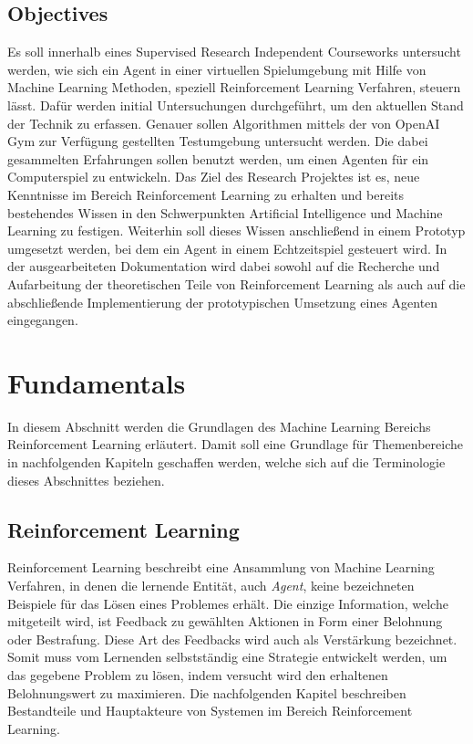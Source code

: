 \documentclass[11pt]{scrartcl}
\begin{document}
\subsection{Objectives}
Es soll innerhalb eines Supervised Research Independent Courseworks untersucht werden, wie
sich ein Agent in einer virtuellen Spielumgebung mit Hilfe von Machine Learning Methoden,
speziell Reinforcement Learning Verfahren, steuern lässt. Dafür werden initial
Untersuchungen durchgeführt, um den aktuellen Stand der Technik zu erfassen. Genauer
sollen Algorithmen mittels der von OpenAI Gym zur Verfügung gestellten Testumgebung
untersucht werden. Die dabei gesammelten Erfahrungen sollen benutzt werden, um einen
Agenten für ein Computerspiel zu entwickeln. Das Ziel des Research Projektes ist es, neue
Kenntnisse im Bereich Reinforcement Learning zu erhalten und bereits bestehendes Wissen in
den Schwerpunkten Artificial Intelligence und Machine Learning zu festigen. Weiterhin soll
dieses Wissen anschließend in einem Prototyp umgesetzt werden, bei dem ein Agent in einem
Echtzeitspiel gesteuert wird. In der ausgearbeiteten Dokumentation wird dabei sowohl auf die
Recherche und Aufarbeitung der theoretischen Teile von Reinforcement Learning als auch auf
die abschließende Implementierung der prototypischen Umsetzung eines Agenten eingegangen.


\newpage
\section{Fundamentals}
In diesem Abschnitt werden die Grundlagen des Machine Learning Bereichs Reinforcement Learning 
erläutert. Damit soll eine Grundlage für Themenbereiche in nachfolgenden Kapiteln geschaffen
werden, welche sich auf die Terminologie dieses Abschnittes beziehen.

\subsection{Reinforcement Learning}
Reinforcement Learning beschreibt eine Ansammlung von Machine Learning Verfahren, in denen die 
lernende Entität, auch \textit{Agent}, keine bezeichneten Beispiele für das Lösen eines Problemes 
erhält. Die einzige Information, welche mitgeteilt wird, ist Feedback zu gewählten Aktionen in Form
einer Belohnung oder Bestrafung. Diese Art des Feedbacks wird auch als Verstärkung bezeichnet.
Somit muss vom Lernenden selbstständig eine Strategie entwickelt werden, um das gegebene
Problem zu lösen, indem versucht wird den erhaltenen Belohnungswert zu maximieren. Die nachfolgenden
Kapitel beschreiben Bestandteile und Hauptakteure von Systemen im Bereich Reinforcement Learning.
\end{document}
